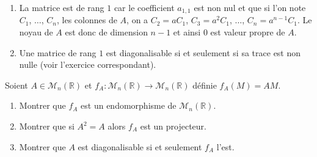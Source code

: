 \documentclass[a4paper,10pt]{report}
\begin{document}
\corr 
\begin{enumerate}
\item La matrice est de rang $1$ car le coefficient $a_{1,1}$ est non nul et que si l'on note $C_1$, $\ldots$, $C_n$, les colonnes de $A$, on a $C_2= aC_1$, $C_3=a^2 C_1$, $\ldots$, $C_n=a^{n-1} C_1$. Le noyau de $A$ est donc de dimension $n-1$ et ainsi $0$ est valeur propre de $A$.
\item Une matrice de rang $1$ est diagonalisable si et seulement si sa trace est non nulle (voir l'exercice correspondant).
\end{enumerate}

\begin{Exa} Soient $A \in \mathcal{M}_n(\mathbb{R})$ et $f_A : \mathcal{M}_n(\mathbb{R}) \rightarrow \mathcal{M}_n(\mathbb{R})$ définie $f_A(M)=AM$.

\begin{enumerate}
\item Montrer que $f_A$ est un endomorphisme de $\mathcal{M}_n(\mathbb{R})$.
\item Montrer que si $A^2=A$ alors $f_A$ est un projecteur.
\item Montrer que $A$ est diagonalisable si et seulement $f_A$ l'est.
\end{enumerate}
\end{Exa}

\corr 
\end{document}

